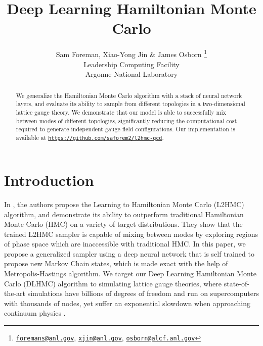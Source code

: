\documentclass{article} %
\title{Deep Learning Hamiltonian Monte Carlo}
\author{Sam Foreman, Xiao-Yong Jin \& James Osborn
\thanks{
   \texttt{\href{mailto:foremans@anl.gov}{foremans@anl.gov}},
   \texttt{\href{mailto:xjin@anl.gov}{xjin@anl.gov}},
   \texttt{\href{mailto:osborn@alcf.anl.gov}{osborn@alcf.anl.gov}}
}\\
   Leadership Computing Facility\\
   Argonne National Laboratory\\
}
\begin{document}
\maketitle
\begin{abstract}
   We generalize the Hamiltonian Monte Carlo algorithm with a stack of neural network layers,
   and evaluate its ability to sample from
   different topologies in a two-dimensional lattice gauge theory.
   We demonstrate that our model is able to successfully mix between modes of different topologies,
   significantly reducing the computational cost required to generate independent gauge field configurations.
   Our implementation is available at
   \texttt{\href{https://github.com/saforem2/lh2mc-qcd}{https://github.com/saforem2/l2hmc-qcd}}.
\end{abstract}

\section{\label{sec:introduction}Introduction}
In \citet{levy2017}, the authors propose the Learning to Hamiltonian Monte Carlo (L2HMC) algorithm, and demonstrate
its ability to outperform traditional Hamiltonian Monte Carlo (HMC) on a variety of %
target
distributions.
%
They show that the trained L2HMC sampler is capable of mixing between modes by exploring regions of phase space which are %
inaccessible with traditional HMC.\@
%
In this paper, we propose a generalized sampler using a deep neural network that is self trained to propose new Markov Chain states,
which is made exact with the help of Metropolis-Hastings \citep{zbMATH03349185} algorithm.
We target our Deep Learning Hamiltonian Monte Carlo (DLHMC) algorithm to simulating lattice gauge theories,
where state-of-the-art simulations have billions of degrees of freedom and run on supercomputers with thousands of nodes,
yet suffer an exponential slowdown when approaching continuum physics \citep{schaefer2009investigating,cossu2018testing}.
\end{document}
